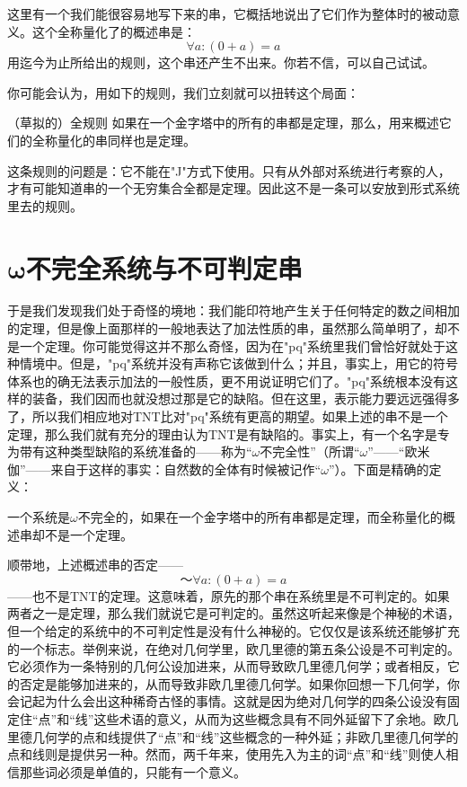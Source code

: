 这里有一个我们能很容易地写下来的串，它概括地说出了它们作为整体时的被动意义。这个全称量化了的概述串是：
\[
\forall a:(0+a)=a
\]
用迄今为止所给出的规则，这个串还产生不出来。你若不信，可以自己试试。

你可能会认为，用如下的规则，我们立刻就可以扭转这个局面：

\begin{thm}[\parindent]{（草拟的）全规则}
如果在一个金字塔中的所有的串都是定理，那么，用来概述它们的全称量化的串同样也是定理。
\end{thm}

这条规则的问题是：它不能在"J"方式下使用。只有从外部对系统进行考察的人，才有可能知道串的一个无穷集合全都是定理。因此这不是一条可以安放到形式系统里去的规则。

\section{\texorpdfstring{$\symbf{\omega}$}{\textomega}不完全系统与不可判定串}

于是我们发现我们处于奇怪的境地：我们能印符地产生关于任何特定的数之间相加的定理，但是像上面那样的一般地表达了加法性质的串，虽然那么简单明了，却不是一个定理。你可能觉得这并不那么奇怪，因为在"pq"系统里我们曾恰好就处于这种情境中。但是，"pq"系统并没有声称它该做到什么；并且，事实上，用它的符号体系也的确无法表示加法的一般性质，更不用说证明它们了。"pq"系统根本没有这样的装备，我们因而也就没想过那是它的缺陷。但在这里，表示能力要远远强得多了，所以我们相应地对TNT比对"pq"系统有更高的期望。如果上述的串不是一个定理，那么我们就有充分的理由认为TNT是有缺陷的。事实上，有一个名字是专为带有这种类型缺陷的系统准备的——称为“$\omega$不完全性”（所谓“$\omega$”——“欧米伽”——来自于这样的事实：自然数的全体有时候被记作“$\omega$”）。下面是精确的定义：

\begin{block}
一个系统是$\omega$不完全的，如果在一个金字塔中的所有串都是定理，而全称量化的概述串却不是一个定理。
\end{block}

顺带地，上述概述串的否定——
\[
～\forall a:(0+a)=a
\]
——也不是TNT的定理。这意味着，原先的那个串在系统里是不可判定的。如果两者之一是定理，那么我们就说它是可判定的。虽然这听起来像是个神秘的术语，但一个给定的系统中的不可判定性是没有什么神秘的。它仅仅是该系统还能够扩充的一个标志。举例来说，在绝对几何学里，欧几里德的第五条公设是不可判定的。它必须作为一条特别的几何公设加进来，从而导致欧几里德几何学；或者相反，它的否定是能够加进来的，从而导致非欧几里德几何学。如果你回想一下几何学，你会记起为什么会出这种稀奇古怪的事情。这就是因为绝对几何学的四条公设没有固定住“点”和“线”这些术语的意义，从而为这些概念具有不同外延留下了余地。欧几里德几何学的点和线提供了“点”和“线”这些概念的一种外延；非欧几里德几何学的点和线则是提供另一种。然而，两千年来，使用先入为主的词“点”和“线”则使人相信那些词必须是单值的，只能有一个意义。

